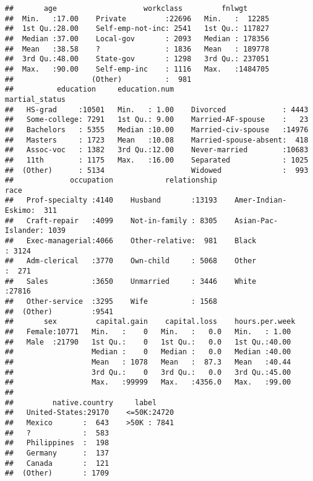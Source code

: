 \documentclass[]{article}
\begin{document}
\begin{verbatim}
##       age                    workclass         fnlwgt       
##  Min.   :17.00    Private         :22696   Min.   :  12285  
##  1st Qu.:28.00    Self-emp-not-inc: 2541   1st Qu.: 117827  
##  Median :37.00    Local-gov       : 2093   Median : 178356  
##  Mean   :38.58    ?               : 1836   Mean   : 189778  
##  3rd Qu.:48.00    State-gov       : 1298   3rd Qu.: 237051  
##  Max.   :90.00    Self-emp-inc    : 1116   Max.   :1484705  
##                  (Other)          :  981                    
##          education     education.num                  martial_status 
##   HS-grad     :10501   Min.   : 1.00    Divorced             : 4443  
##   Some-college: 7291   1st Qu.: 9.00    Married-AF-spouse    :   23  
##   Bachelors   : 5355   Median :10.00    Married-civ-spouse   :14976  
##   Masters     : 1723   Mean   :10.08    Married-spouse-absent:  418  
##   Assoc-voc   : 1382   3rd Qu.:12.00    Never-married        :10683  
##   11th        : 1175   Max.   :16.00    Separated            : 1025  
##  (Other)      : 5134                    Widowed              :  993  
##             occupation            relationship                    race      
##   Prof-specialty :4140    Husband       :13193    Amer-Indian-Eskimo:  311  
##   Craft-repair   :4099    Not-in-family : 8305    Asian-Pac-Islander: 1039  
##   Exec-managerial:4066    Other-relative:  981    Black             : 3124  
##   Adm-clerical   :3770    Own-child     : 5068    Other             :  271  
##   Sales          :3650    Unmarried     : 3446    White             :27816  
##   Other-service  :3295    Wife          : 1568                              
##  (Other)         :9541                                                      
##       sex         capital.gain    capital.loss    hours.per.week 
##   Female:10771   Min.   :    0   Min.   :   0.0   Min.   : 1.00  
##   Male  :21790   1st Qu.:    0   1st Qu.:   0.0   1st Qu.:40.00  
##                  Median :    0   Median :   0.0   Median :40.00  
##                  Mean   : 1078   Mean   :  87.3   Mean   :40.44  
##                  3rd Qu.:    0   3rd Qu.:   0.0   3rd Qu.:45.00  
##                  Max.   :99999   Max.   :4356.0   Max.   :99.00  
##                                                                  
##         native.country     label      
##   United-States:29170    <=50K:24720  
##   Mexico       :  643    >50K : 7841  
##   ?            :  583                 
##   Philippines  :  198                 
##   Germany      :  137                 
##   Canada       :  121                 
##  (Other)       : 1709
\end{verbatim}
\end{document}
